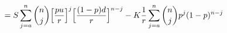 \documentclass[preview]{standalone}
\begin{document}
\begin{align*}
= S \sum^{n}_{j=a} {{n}\choose{j}} \Big[ {p u \over r} \Big]^{j} \Big[ {(1-p) d \over r} \Big]^{n-j} - K {1 \over r} \sum^{n}_{j=a} {{n}\choose{j}} p^{j} (1-p)^{n-j}
\end{align*}
\end{document}
